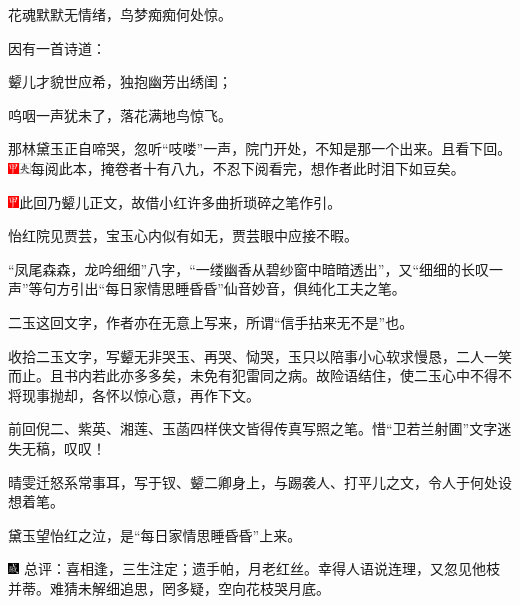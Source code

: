 花魂默默无情绪，鸟梦痴痴何处惊。

因有一首诗道：

颦儿才貌世应希，独抱幽芳出绣闺；

呜咽一声犹未了，落花满地鸟惊飞。

那林黛玉正自啼哭，忽听“吱喽”一声，院门开处，不知是那一个出来。且看下回。{\includegraphics[width=3mm]{../Images/00002}\includegraphics[width=3mm]{../Images/00012}\footnotesize \kaishu 每阅此本，掩卷者十有八九，不忍下阅看完，想作者此时泪下如豆矣。}

\includegraphics[width=3mm]{../Images/00002}{此回乃颦儿正文，故借小红许多曲折琐碎之笔作引。}

{怡红院见贾芸，宝玉心内似有如无，贾芸眼中应接不暇。}

{“凤尾森森，龙吟细细”八字，“一缕幽香从碧纱窗中暗暗透出”，又“细细的长叹一声”等句方引出“每日家情思睡昏昏”仙音妙音，俱纯化工夫之笔。}

{二玉这回文字，作者亦在无意上写来，所谓“信手拈来无不是”也。}

{收拾二玉文字，写颦无非哭玉、再哭、恸哭，玉只以陪事小心软求慢恳，二人一笑而止。且书内若此亦多多矣，未免有犯雷同之病。故险语结住，使二玉心中不得不将现事抛却，各怀以惊心意，再作下文。}

{前回倪二、紫英、湘莲、玉菡四样侠文皆得传真写照之笔。惜“卫若兰射圃”文字迷失无稿，叹叹！}

{晴雯迁怒系常事耳，写于钗、颦二卿身上，与踢袭人、打平儿之文，令人于何处设想着笔。}

{黛玉望怡红之泣，是“每日家情思睡昏昏”上来。}

{\includegraphics[width=3mm]{../Images/00005}  \kaishu 总评：喜相逢，三生注定；遗手帕，月老红丝。幸得人语说连理，又忽见他枝并蒂。难猜未解细追思，罔多疑，空向花枝哭月底。}

